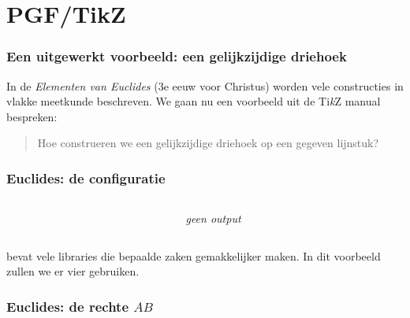 \documentclass[]{beamer}
\begin{document}
\section{PGF/TikZ}

\begin{frame}
  \frametitle{Een uitgewerkt voorbeeld: een gelijkzijdige driehoek}

  In de \emph{Elementen van Euclides} (3e eeuw voor Christus) worden vele constructies in vlakke meetkunde beschreven. We gaan nu een voorbeeld uit de Ti\textit{k}Z manual bespreken:
  \begin{quote}
    Hoe construeren we een gelijkzijdige driehoek op een gegeven lijnstuk?
  \end{quote}
\end{frame}

\begin{frame}
  \frametitle{Euclides: de configuratie}

  \begin{columns}
    \begin{column}{.6\textwidth}
      \inputminted[fontsize = \scriptsize]{latex}{tikz/triangle/configuration.tikz}
    \end{column}
    \begin{column}{.4\textwidth}
      \emph{geen output}
    \end{column}
  \end{columns}

  \TikZ bevat vele libraries die bepaalde zaken gemakkelijker maken. In dit voorbeeld zullen we er vier gebruiken.
\end{frame}

\begin{frame}
  \frametitle{Euclides: de rechte $AB$}

  \begin{columns}
    \begin{column}{.6\textwidth}
      \inputminted[fontsize = \scriptsize]{latex}{tikz/triangle/1a.tikz}
    \end{column}
    \begin{column}{.4\textwidth}
      
    \end{column}
  \end{columns}


\end{frame}
\end{document}
